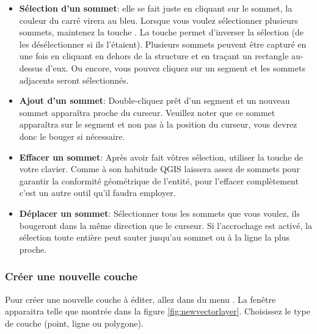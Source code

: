 \begin{itemize}
\begin{itemize}
\item \textbf{Sélection d'un sommet}: elle se fait juste en cliquant sur le sommet, la couleur du carré virera au bleu. Lorsque vous voulez sélectionner plusieurs sommets, maintenez la touche . La touche   permet d'inverser la sélection (de les désélectionner si ils l'étaient). Plusieurs sommets peuvent être capturé en une fois en cliquant en dehors de la structure et en traçant un rectangle au-dessus d'eux. Ou encore, vous pouvez cliquez sur un segment et les sommets adjacents seront sélectionnés.
\item \textbf{Ajout d'un sommet}: Double-cliquez prêt d'un segment et un nouveau sommet apparaîtra proche du curseur. Veuillez noter que ce sommet apparaîtra sur le segment et non pas à la position du curseur, vous devrez donc le bouger si nécessaire.
\item \textbf{Effacer un sommet}: Après avoir fait vôtres sélection, utiliser la touche  de votre clavier. Comme à son habitude QGIS laissera assez de sommets pour garantir la conformité géométrique de l'entité, pour l'effacer complètement c'est un autre outil qu'il faudra employer.
\item \textbf{Déplacer un sommet}: Sélectionner tous les sommets que vous voulez, ils bougeront dans la même direction que le curseur. Si l'accrochage est activé, la sélection toute entière peut sauter jusqu'au sommet ou à la ligne la plus proche.
\end{itemize}

\subsubsection{Créer une nouvelle couche}\label{sec:create shape}

Pour créer une nouvelle couche à éditer, allez dans  du menu . La fenêtre  apparaitra telle que montrée dans la figure \ref{fig:newvectorlayer}. Choisissez le type de couche (point, ligne ou polygone).


\end{itemize}
